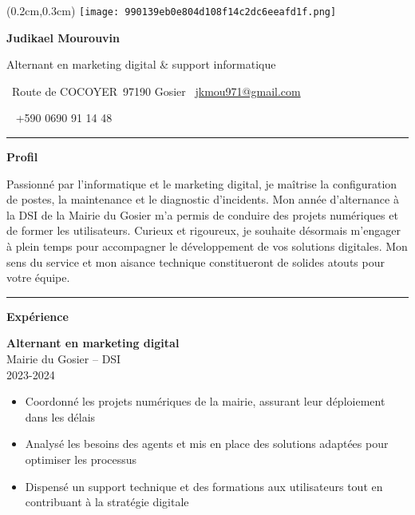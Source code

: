 \documentclass[a4paper]{article}
\renewcommand{\colorbox}[2]{#2}%
\newcommand{\fullrule}{\hspace{-1.5cm}\rule{\paperwidth}{0.4pt}}
\newcommand{\cvsection}[1]{%
  \vspace{6pt}\textbf{\Large #1}\par\vspace{2pt}}
\begin{document}
\color{white}
\begin{textblock*}{4cm}(0.2cm,0.3cm)
  \texttt{[image: 990139eb0e804d108f14c2dc6eeafd1f.png]}
\end{textblock*}

\begin{center}
  {\fontsize{44pt}{24pt}\selectfont\bfseries Judikael Mourouvin}

  \bigskip
  {\Large Alternant en marketing digital \& support informatique}

  \bigskip\bigskip
  \faMapMarker~Route de COCOYER\ 97190 Gosier
  \quad\faEnvelope~\href{mailto:jkmou971@gmail.com}{jkmou971@gmail.com}

  \bigskip
  \faPhone~ +590 0690 91 14 48
  \quad \faLinkedin\ \href{}{}
 

  \vspace{-0.3cm}
  \fullrule
\end{center}

\cvsection{Profil}

Passionné par l’informatique et le marketing digital, je maîtrise la configuration de postes, la maintenance et le diagnostic d’incidents. Mon année d’alternance à la DSI de la Mairie du Gosier m’a permis de conduire des projets numériques et de former les utilisateurs. Curieux et rigoureux, je souhaite désormais m’engager à plein temps pour accompagner le développement de vos solutions digitales. Mon sens du service et mon aisance technique constitueront de solides atouts pour votre équipe.

\medskip\fullrule

\cvsection{Expérience}
\hspace*{1.3cm}%

\colorbox{maincolor}{%
  \begin{minipage}{\linewidth}
    \textbf{Alternant en marketing digital} \\ Mairie du Gosier – DSI \\ 2023-2024
    \begin{itemize}
      \item Coordonné les projets numériques de la mairie, assurant leur déploiement dans les délais \item Analysé les besoins des agents et mis en place des solutions adaptées pour optimiser les processus \item Dispensé un support technique et des formations aux utilisateurs tout en contribuant à la stratégie digitale
    \end{itemize}
  \end{minipage}}
\end{document}
